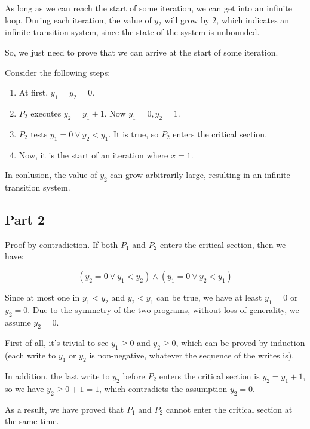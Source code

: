 As long as we can reach the start of some iteration, we can get into an infinite loop.
During each iteration, the value of $y_2$ will grow by $2$, which indicates an infinite transition system,
since the state of the system is unbounded.

So, we just need to prove that we can arrive at the start of some iteration.

Consider the following steps:

\begin{enumerate}
    \item At first, $y_1 = y_2 = 0$.
    \item $P_2$ executes $y_2 = y_1 + 1$.
        Now $y_1 = 0, y_2 = 1$.
    \item $P_2$ tests $y_1 = 0 \vee y_2 < y_1$.
        It is true, so $P_2$ enters the critical section.
    \item Now, it is the start of an iteration where $x = 1$.
\end{enumerate}

In conlusion, the value of $y_2$ can grow arbitrarily large, resulting in an infinite transition system.

\subsection{Part 2}

Proof by contradiction. If both $P_1$ and $P_2$ enters the critical section, then we have:

$$
(y_2 = 0 \vee y_1 < y_2) \wedge (y_1 = 0 \vee y_2 < y_1)
$$

Since at most one in $y_1 < y_2$ and $y_2 < y_1$ can be true, we have at least $y_1 = 0$ or $y_2 = 0$.
Due to the symmetry of the two programs, without loss of generality, we assume $y_2 = 0$.

First of all, it's trivial to see $y_1 \ge 0$ and $y_2 \ge 0$, which can be proved by induction
(each write to $y_1$ or $y_2$ is non-negative, whatever the sequence of the writes is).

In addition, the last write to $y_2$ before $P_2$ enters the critical section is $y_2 = y_1 + 1$,
so we have $y_2 \ge 0 + 1 = 1$, which contradicts the assumption $y_2 = 0$.

As a result, we have proved that $P_1$ and $P_2$ cannot enter the critical section at the same time.
